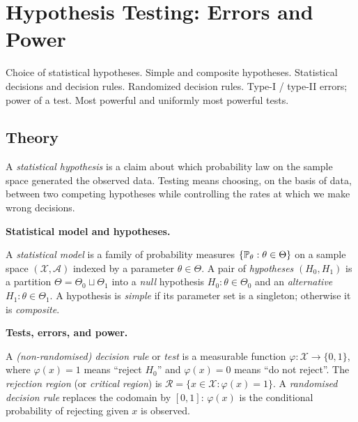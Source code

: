 
\section{Hypothesis Testing: Errors and Power}
\label{sec:1.2.12-hypothesis-testing}

\begin{ticket}
Choice of statistical hypotheses. Simple and composite hypotheses. Statistical decisions and decision rules. Randomized decision rules. Type-I / type-II errors; power of a test. Most powerful and uniformly most powerful tests.
\end{ticket}

\subsection*{Theory}

A \emph{statistical hypothesis} is a claim about which probability
law on the sample space generated the observed data. Testing means
choosing, on the basis of data, between two competing hypotheses
while controlling the rates at which we make wrong decisions.

\medskip
\noindent\textbf{Statistical model and hypotheses.}

\begin{definition}[Hypothesis]
\label{def:hypothesis}
A \emph{statistical model} is a family of probability measures
$\{\mathbb{P}_\theta : \theta \in \Theta\}$ on a sample space
$(\mathcal{X}, \mathcal{A})$ indexed by a parameter
$\theta \in \Theta$. A pair of \emph{hypotheses}
$(H_0, H_1)$ is a partition $\Theta = \Theta_0 \sqcup \Theta_1$
into a \emph{null} hypothesis $H_0 : \theta \in \Theta_0$ and an
\emph{alternative} $H_1 : \theta \in \Theta_1$. A hypothesis is
\emph{simple} if its parameter set is a singleton; otherwise it is
\emph{composite}.
\end{definition}

\medskip
\noindent\textbf{Tests, errors, and power.}

\begin{definition}
\label{def:decision-rule}
A \emph{(non-randomised) decision rule} or \emph{test} is a
measurable function $\varphi \colon \mathcal{X} \to \{0, 1\}$,
where $\varphi(x) = 1$ means ``reject $H_0$'' and $\varphi(x) = 0$
means ``do not reject''. The \emph{rejection region} (or
\emph{critical region}) is
$\mathcal{R} = \{x \in \mathcal{X} : \varphi(x) = 1\}$. A
\emph{randomised decision rule} replaces the codomain by $[0, 1]$:
$\varphi(x)$ is the conditional probability of rejecting given
$x$ is observed.
\end{definition}

